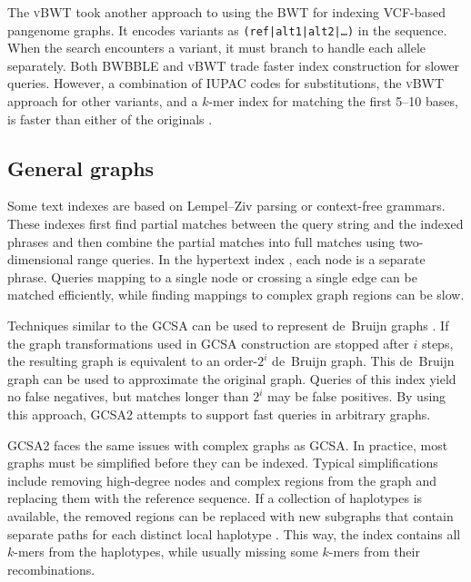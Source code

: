 The \textsc{vBWT} \cite{Maciuca_2016} took another approach to using the BWT for indexing VCF-based pangenome graphs.
It encodes variants as \texttt{(ref|alt1|alt2|\dots)} in the sequence.
When the search encounters a variant, it must branch to handle each allele separately.
Both \textsc{BWBBLE} and \textsc{vBWT} trade faster index construction for slower queries.
However, a combination of IUPAC codes for substitutions, the \textsc{vBWT} approach for other variants, and a $k$-mer index for matching the first 5--10 bases, is faster than either of the originals \cite{Buechler_2019}.

\subsection{General graphs}

Some text indexes are based on Lempel--Ziv parsing or context-free grammars.
These indexes first find partial matches between the query string and the indexed phrases and then combine the partial matches into full matches using two-dimensional range queries.
In the hypertext index \cite{Thachuk_2013}, each node is a separate phrase.
Queries mapping to a single node or crossing a single edge can be matched efficiently, while finding mappings to complex graph regions can be slow.

Techniques similar to the \textsc{GCSA} can be used to represent de~Bruijn graphs \cite{Bowe_2012}.
If the graph transformations used in \textsc{GCSA} construction are stopped after $i$ steps, the resulting graph is equivalent to an order-$2^{i}$ de~Bruijn graph.
This de~Bruijn graph can be used to approximate the original graph.
Queries of this index yield no false negatives, but matches longer than $2^{i}$ may be false positives.
By using this approach, \textsc{GCSA2} \cite{Siren_2017} attempts to support fast queries in arbitrary graphs.

\textsc{GCSA2} faces the same issues with complex graphs as \textsc{GCSA}.
In practice, most graphs must be simplified before they can be indexed.
Typical simplifications include removing high-degree nodes and complex regions from the graph and replacing them with the reference sequence.
If a collection of haplotypes is available, the removed regions can be replaced with new subgraphs that contain separate paths for each distinct local haplotype \cite{Siren_2019}.
This way, the index contains all $k$-mers from the haplotypes, while usually missing some $k$-mers from their recombinations.

